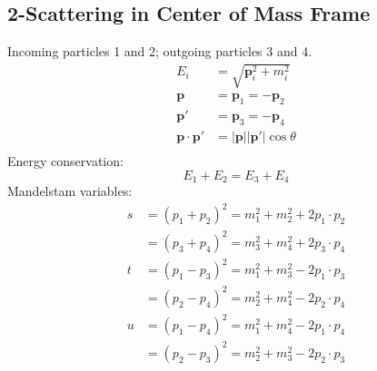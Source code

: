 \documentclass[12pt]{article}
\theoremstyle{definition}
\begin{document}
\subsection{2-Scattering in Center of Mass Frame}
Incoming particles 1 and 2; outgoing particles 3 and 4.
\begin{equation*}
\begin{split}
    E_i &= \sqrt{\bm{p}_i^2 + m_i^2} \\
    \bm{p} &= \bm{p}_1 = -\bm{p}_2 \\
    \bm{p}' &= \bm{p}_3 = - \bm{p}_4 \\
    \bm{p} \cdot \bm{p}' &= |\bm{p}| |\bm{p}'| \cos\theta \\
\end{split}
\end{equation*}
Energy conservation:
\begin{equation*}
    E_1 + E_2 = E_3 + E_4
\end{equation*}
Mandelstam variables:
\begin{equation*}
\begin{split}
    s &= (p_1 + p_2)^2 = m_1^2 + m_2^2 + 2 p_1 \cdot p_2 \\
      &= (p_3 + p_4)^2 = m_3^2 + m_4^2 + 2 p_3 \cdot p_4 \\
    t &= (p_1 - p_3)^2 = m_1^2 + m_3^2 - 2 p_1 \cdot p_3 \\
      &= (p_2 - p_4)^2 = m_2^2 + m_4^2 - 2 p_2 \cdot p_4 \\
    u &= (p_1 - p_4)^2 = m_1^2 + m_4^2 - 2 p_1 \cdot p_4 \\
      &= (p_2 - p_3)^2 = m_2^2 + m_3^2 - 2 p_2 \cdot p_3 \\
\end{split}
\end{equation*}
\end{document}
